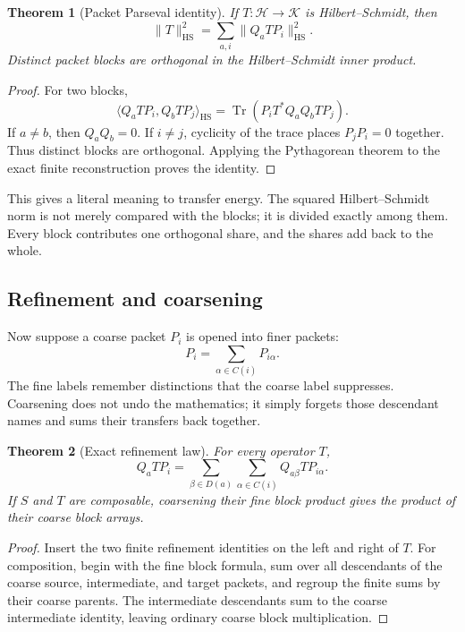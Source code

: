 \documentclass[11pt]{article}
\newtheorem{theorem}{Theorem}[section]
\theoremstyle{definition}
\theoremstyle{remark}
\begin{document}
\begin{theorem}[Packet Parseval identity]
If \(T:\mathcal H\to\mathcal K\) is Hilbert--Schmidt, then
\[
\boxed{
\|T\|_{\mathrm{HS}}^2
=
\sum_{a,i}\|Q_aTP_i\|_{\mathrm{HS}}^2.
}
\]
Distinct packet blocks are orthogonal in the Hilbert--Schmidt inner product.
\end{theorem}

\begin{proof}
For two blocks,
\[
\langle Q_aTP_i,Q_bTP_j\rangle_{\mathrm{HS}}
=
\operatorname{Tr}
\left(P_iT^*Q_aQ_bTP_j\right).
\]
If \(a\ne b\), then \(Q_aQ_b=0\).  If \(i\ne j\), cyclicity of the trace places \(P_jP_i=0\) together.  Thus distinct blocks are orthogonal.  Applying the Pythagorean theorem to the exact finite reconstruction proves the identity.
\end{proof}

This gives a literal meaning to transfer energy.  The squared Hilbert--Schmidt norm is not merely compared with the blocks; it is divided exactly among them.  Every block contributes one orthogonal share, and the shares add back to the whole.

\subsection{Refinement and coarsening}

Now suppose a coarse packet \(P_i\) is opened into finer packets:
\[
P_i=\sum_{\alpha\in C(i)}P_{i\alpha}.
\]
The fine labels remember distinctions that the coarse label suppresses.  Coarsening does not undo the mathematics; it simply forgets those descendant names and sums their transfers back together.

\begin{theorem}[Exact refinement law]
For every operator \(T\),
\[
\boxed{
Q_aTP_i
=
\sum_{\beta\in D(a)}
\sum_{\alpha\in C(i)}
Q_{a\beta}TP_{i\alpha}.
}
\]
If \(S\) and \(T\) are composable, coarsening their fine block product gives the product of their coarse block arrays.
\end{theorem}

\begin{proof}
Insert the two finite refinement identities on the left and right of \(T\).  For composition, begin with the fine block formula, sum over all descendants of the coarse source, intermediate, and target packets, and regroup the finite sums by their coarse parents.  The intermediate descendants sum to the coarse intermediate identity, leaving ordinary coarse block multiplication.
\end{proof}
\end{document}
